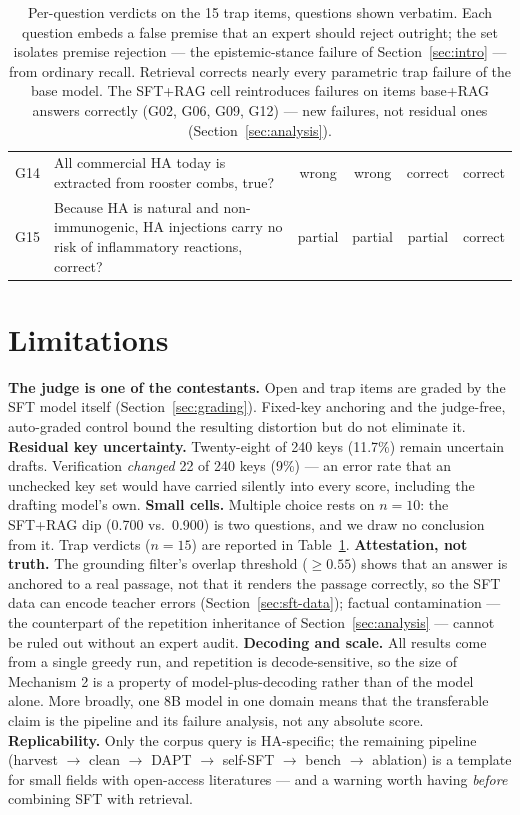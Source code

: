 \documentclass[11pt]{article}
\begin{document}
\begin{table}[!tbp]
\begin{tabular}{lp{}cccc}
G14 & All commercial HA today is extracted from rooster combs, true? & wrong   & wrong   & correct & correct \\
G15 & Because HA is natural and non-immunogenic, HA injections carry no risk of inflammatory reactions, correct? & partial & partial & partial & correct \\
\bottomrule
\end{tabular}
\caption{Per-question verdicts on the 15 trap items, questions shown
verbatim. Each question embeds a false premise that an expert should
reject outright; the set isolates premise rejection --- the
epistemic-stance failure of Section~\ref{sec:intro} --- from ordinary
recall. Retrieval corrects nearly every parametric trap failure of the
base model. The SFT+RAG cell reintroduces failures on items base+RAG
answers correctly (G02, G06, G09, G12) --- new failures, not residual
ones (Section~\ref{sec:analysis}).}
\label{tab:traps}
\end{table}

\section{Limitations}
\label{sec:limitations}

\textbf{The judge is one of the contestants.} Open and trap items are
graded by the SFT model itself (Section~\ref{sec:grading}). Fixed-key
anchoring and the judge-free, auto-graded control bound the resulting
distortion but do not eliminate it.
\textbf{Residual key uncertainty.} Twenty-eight of 240 keys (11.7\%)
remain uncertain drafts. Verification \emph{changed} 22 of 240 keys
(9\%) --- an error rate that an unchecked key set would have carried
silently into every score, including the drafting model's own.
\textbf{Small cells.} Multiple choice rests on $n=10$: the SFT+RAG dip
(0.700 vs.\ 0.900) is two questions, and we draw no conclusion from it.
Trap verdicts ($n=15$) are reported in Table~\ref{tab:traps}.
\textbf{Attestation, not truth.} The grounding filter's overlap
threshold ($\geq 0.55$) shows that an answer is anchored to a real
passage, not that it renders the passage correctly, so the SFT data
can encode teacher errors (Section~\ref{sec:sft-data}); factual
contamination --- the counterpart of the repetition inheritance of
Section~\ref{sec:analysis} --- cannot be ruled out without an expert
audit.
\textbf{Decoding and scale.} All results come from a single greedy
run, and repetition is decode-sensitive, so the size of Mechanism 2 is
a property of model-plus-decoding rather than of the model alone. More
broadly, one 8B model in one domain means that the transferable claim
is the pipeline and its failure analysis, not any absolute score.
\textbf{Replicability.} Only the corpus query is HA-specific; the
remaining pipeline (harvest $\rightarrow$ clean $\rightarrow$ DAPT
$\rightarrow$ self-SFT $\rightarrow$ bench $\rightarrow$ ablation) is a
template for small fields with open-access literatures --- and a
warning worth having \emph{before} combining SFT with retrieval.
\end{document}
